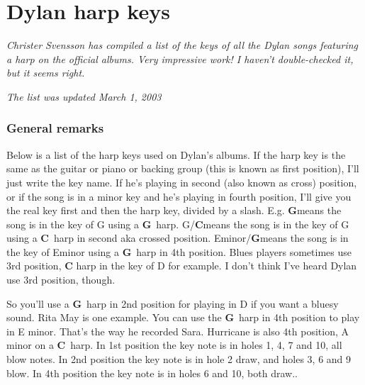 \documentclass[a4paper,twoside]{memoir}
\begin{document}

\newcommand{\G}{\textcolor{G}{\textbf{G}}}
\newcommand{\A}{\textcolor{A}{\textbf{A}}}
\newcommand{\C}{\textcolor{C}{\textbf{C}}}
\newcommand{\D}{\textcolor{D}{\textbf{D}}}
\newcommand{\E}{\textcolor{E}{\textbf{E}}}

\section*{Dylan harp keys }

\emph{Christer Svensson has compiled a list of the keys of all the
Dylan songs featuring a harp on the official albums. Very impressive
work! I haven't double-checked it, but it seems right.
}

\emph{The list was updated March 1, 2003}

\subsubsection*{General remarks}

Below is a list of the harp keys used on Dylan's albums. If the harp
key is the same as the guitar or piano or backing group (this is known
as first position), I'll just write the key name. If he's playing in
second (also known as cross) position, or if the song is in a minor
key and he's playing in fourth position, I'll give you the real
key first and then the harp key, divided by a slash. E.g. \G means
the song is in the key of G using a \G~harp. G/\C means the song is
in the key of G using a \C~harp in second aka crossed
position. Eminor/\G means the song is in the key of Eminor using a
\G~harp in 4th position. Blues players sometimes use 3rd position, \C
harp in the key of D for example. I don't think I've heard Dylan use
3rd position, though.

So you'll use a \G~harp in 2nd position for playing in D if you want a
bluesy sound. Rita May is one example. You can use the \G~harp in
4th position to play in E minor. That's the way he recorded
Sara. Hurricane is also 4th position, A minor on a \C~harp. In
1st position the key note is in holes 1, 4, 7 and 10, all blow
notes. In 2nd position the key note is in hole 2 draw, and holes 3, 6
and 9 blow. In 4th position the key note is in holes 6 and 10, both
draw..
\end{document}
